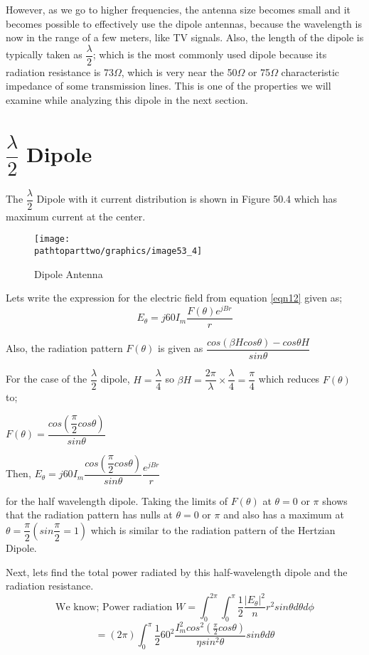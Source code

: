However, as we go to higher frequencies, the antenna size becomes small and it becomes possible to effectively use the dipole antennas, because the wavelength is now in the range of a few meters, like TV signals. Also, the length of the dipole is typically taken as $\dfrac{\lambda}{2}$; which is the most commonly used dipole because its radiation resistance is 73$\Omega$, which is very near the 50$\Omega$ or 75$\Omega$ characteristic impedance of some transmission lines. This is one of the properties we will examine while analyzing this dipole in the next section.
\section{$\dfrac{\lambda}{2}$ Dipole}
The $\dfrac{\lambda}{2}$ Dipole with it current distribution is shown in Figure 50.4 which has maximum current at the center.
\begin{figure}[h]
\centering
\texttt{[image: \\pathtoparttwo/graphics/image53\_4]}
\caption{Dipole Antenna}
\label{fig:fig4}
\end{figure}
Lets write the expression for the electric field from equation \ref{eqn12} given as; 
\begin{equation*}
E_\theta = j60I_m \frac{F(\theta)e^{jBr}}{r}
\end{equation*}
\begin{center}
Also, the radiation pattern $F(\theta)$ is given as $\dfrac{cos(\beta H cos\theta) - cos\theta H}{sin \theta}$

For the case of the $\dfrac{\lambda}{2}$ dipole, $H = \dfrac{\lambda}{4}$ so $\beta H = \dfrac{2\pi}{\lambda} \times \dfrac{\lambda}{4}= \dfrac{\pi}{4} $ which reduces $F(\theta)$ to;

$F(\theta) = \dfrac{cos (\dfrac{\pi}{2} cos\theta)}{sin\theta}$

Then, $E_\theta = j60I_m \dfrac{cos (\dfrac{\pi}{2} cos\theta)}{sin\theta} \dfrac{e^{jBr}}{r}$ 
\end{center}for the half wavelength dipole.
Taking the limits of $F(\theta)$ at $\theta = 0$ or $\pi$ shows that the radiation pattern has nulls at $\theta = 0 \text{ or } \pi$ and also has a maximum at $\theta = \dfrac{\pi}{2} (sin \dfrac{\pi}{2} = 1)$ which is similar to the radiation pattern of the Hertzian Dipole.

Next, lets find the total power radiated by this half-wavelength dipole and the radiation resistance. 
\[ \text{We know; Power radiation } W = \int_0^{2\pi}\int_{0}^{\pi} \frac{1}{2}\frac{|E_\theta|^2}{n}r^2sin\theta d\theta d\phi \]
\[ = (2\pi)\int_{0}^{\pi} \frac{1}{2} 60^2 \frac{I_m^2cos^2(\frac{\pi}{2}cos\theta)}{\eta sin^2\theta}sin\theta d\theta \]


